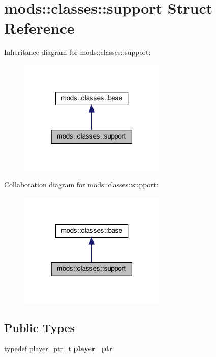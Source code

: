 \hypertarget{structmods_1_1classes_1_1support}{}\section{mods\+:\+:classes\+:\+:support Struct Reference}
\label{structmods_1_1classes_1_1support}


Inheritance diagram for mods\+:\+:classes\+:\+:support\+:\nopagebreak
\begin{figure}[H]
\begin{center}
\leavevmode
\includegraphics[width=199pt]{structmods_1_1classes_1_1support__inherit__graph}
\end{center}
\end{figure}


Collaboration diagram for mods\+:\+:classes\+:\+:support\+:\nopagebreak
\begin{figure}[H]
\begin{center}
\leavevmode
\includegraphics[width=199pt]{structmods_1_1classes_1_1support__coll__graph}
\end{center}
\end{figure}
\subsection*{Public Types}
\begin{DoxyCompactItemize}
\item 
\mbox{\label{structmods_1_1classes_1_1support_a444b4bb82cfcf5c62669b40c4b3e4d79}} 
typedef player\+\_\+ptr\+\_\+t {\bfseries player\+\_\+ptr}
\end{DoxyCompactItemize}
